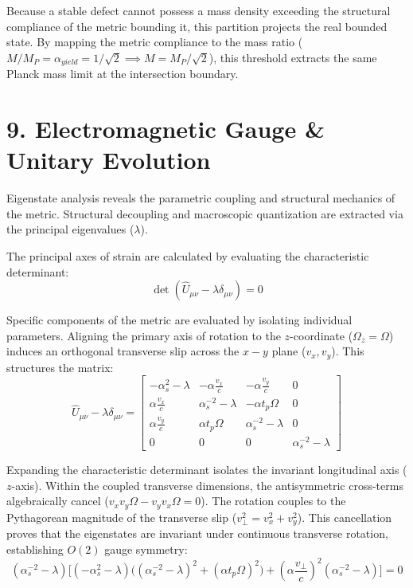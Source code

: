 Because a stable defect cannot possess a mass density exceeding the structural compliance of the metric bounding it, this partition projects the real bounded state. By mapping the metric compliance to the mass ratio ($M/M_P = \alpha_{yield} = 1/\sqrt{2} \implies M = M_P/\sqrt{2}$), this threshold extracts the same Planck mass limit at the intersection boundary. %



\section*{9. Electromagnetic Gauge \& Unitary Evolution} 
Eigenstate analysis reveals the parametric coupling and structural mechanics of the metric. Structural decoupling and macroscopic quantization are extracted via the principal eigenvalues ($\lambda$).

The principal axes of strain are calculated by evaluating the characteristic determinant: 
\begin{equation} 
    \det(\hat{U}_{\mu\nu} - \lambda \delta_{\mu\nu}) = 0 
\end{equation} 

Specific components of the metric are evaluated by isolating individual parameters. Aligning the primary axis of rotation to the $z$-coordinate ($\Omega_z = \Omega$) induces an orthogonal transverse slip across the $x-y$ plane ($v_x, v_y$). This structures the matrix: 
\begin{equation} 
    \hat{U}_{\mu\nu} - \lambda \delta_{\mu\nu} = \begin{bmatrix} 
    -\alpha_s^2 - \lambda & -\alpha \frac{v_x}{c} & -\alpha \frac{v_y}{c} & 0 \\ 
    \alpha \frac{v_x}{c} & \alpha_s^{-2} - \lambda & -\alpha t_p \Omega & 0 \\ 
    \alpha \frac{v_y}{c} & \alpha t_p \Omega & \alpha_s^{-2} - \lambda & 0 \\ 
    0 & 0 & 0 & \alpha_s^{-2} - \lambda 
    \end{bmatrix} 
\end{equation} 

Expanding the characteristic determinant isolates the invariant longitudinal axis ($z$-axis). Within the coupled transverse dimensions, the antisymmetric cross-terms algebraically cancel ($v_x v_y \Omega - v_y v_x \Omega = 0$). The rotation couples to the Pythagorean magnitude of the transverse slip ($v_\perp^2 = v_x^2 + v_y^2$). This cancellation proves that the eigenstates are invariant under continuous transverse rotation, establishing $O(2)$ gauge symmetry: 
\begin{equation} 
    (\alpha_s^{-2} - \lambda) \Big[ (-\alpha_s^2 - \lambda) \big( (\alpha_s^{-2} - \lambda)^2 + (\alpha t_p \Omega)^2 \big) + \left(\alpha \frac{v_\perp}{c}\right)^2 (\alpha_s^{-2} - \lambda) \Big] = 0 
\end{equation}

